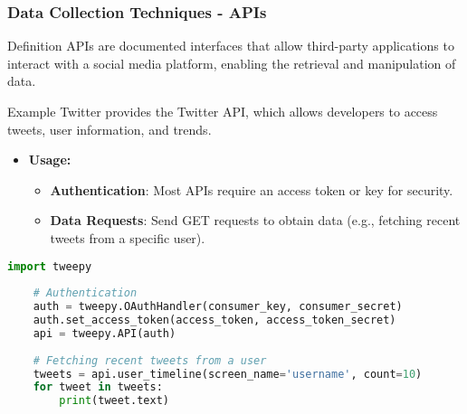 \documentclass{beamer}
\begin{document}
\begin{frame}[fragile]
    \frametitle{Data Collection Techniques - APIs}
    \begin{block}{Definition}
        APIs are documented interfaces that allow third-party applications to interact with a social media platform, enabling the retrieval and manipulation of data.
    \end{block}

    \begin{block}{Example}
        Twitter provides the Twitter API, which allows developers to access tweets, user information, and trends.
    \end{block}

    \begin{itemize}
        \item \textbf{Usage:}
            \begin{itemize}
                \item \textbf{Authentication}: Most APIs require an access token or key for security.
                \item \textbf{Data Requests}: Send GET requests to obtain data (e.g., fetching recent tweets from a specific user).
            \end{itemize}
    \end{itemize}
    
    \begin{lstlisting}[language=Python]
    import tweepy
    
    # Authentication
    auth = tweepy.OAuthHandler(consumer_key, consumer_secret)
    auth.set_access_token(access_token, access_token_secret)
    api = tweepy.API(auth)
    
    # Fetching recent tweets from a user
    tweets = api.user_timeline(screen_name='username', count=10)
    for tweet in tweets:
        print(tweet.text)
    \end{lstlisting}
\end{frame}
\end{document}
